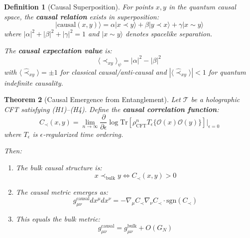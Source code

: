 \documentclass[12pt,a4paper]{article}
\newtheorem{theorem}{Theorem}[section]
\newtheorem{definition}[theorem]{Definition}
\begin{document}
\begin{definition}[Causal Superposition]\label{def:causal-superposition}
For points $x, y$ in the quantum causal space, the \textbf{causal relation} exists in superposition:
\begin{equation}
|\text{causal}(x,y)\rangle = \alpha |x \prec y\rangle + \beta |y \prec x\rangle + \gamma |x \sim y\rangle
\end{equation}
where $|\alpha|^2 + |\beta|^2 + |\gamma|^2 = 1$ and $|x \sim y\rangle$ denotes spacelike separation.

The \textbf{causal expectation value} is:
\begin{equation}
\langle \hat{\prec}_{xy} \rangle_\psi = |\alpha|^2 - |\beta|^2
\end{equation}
with $\langle \hat{\prec}_{xy} \rangle = \pm 1$ for classical causal/anti-causal and $|\langle \hat{\prec}_{xy} \rangle| < 1$ for quantum indefinite causality.
\end{definition}

\begin{theorem}[Causal Emergence from Entanglement]\label{thm:causal-emergence}
Let $\mathcal{T}$ be a holographic CFT satisfying (H1)--(H4). Define the \textbf{causal correlation function}:
\begin{equation}
C_\prec(x, y) = \lim_{n \to \infty} \frac{\partial}{\partial \epsilon} \log \text{Tr}\left[ \rho_{\text{CFT}}^n T_\epsilon\{\mathcal{O}(x)\mathcal{O}(y)\} \right] \bigg|_{\epsilon=0}
\end{equation}
where $T_\epsilon$ is $\epsilon$-regularized time ordering.

Then:
\begin{enumerate}
    \item The bulk causal structure is:
    \begin{equation}
    x \prec_{\text{bulk}} y \iff C_\prec(x,y) > 0
    \end{equation}
    
    \item The causal metric emerges as:
    \begin{equation}
    g_{\mu\nu}^{\text{causal}} dx^\mu dx^\nu = -\nabla_\mu C_\prec \nabla_\nu C_\prec \cdot \text{sgn}(C_\prec)
    \end{equation}
    
    \item This equals the bulk metric:
    \begin{equation}
    g_{\mu\nu}^{\text{causal}} = g_{\mu\nu}^{\text{bulk}} + O(G_N)
    \end{equation}
\end{enumerate}
\end{theorem}
\end{document}
